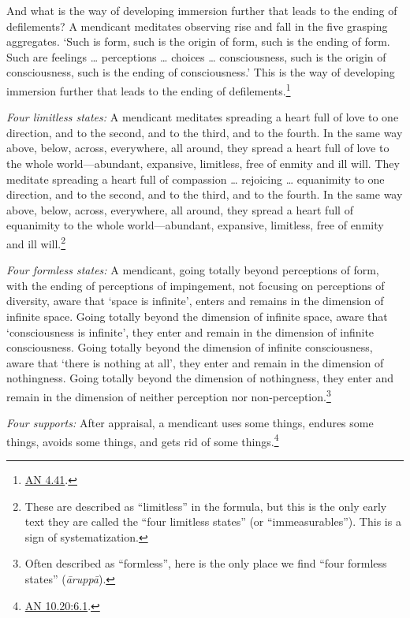 \documentclass[12pt,openany]{book}%
\begin{document}
And what is the way of developing immersion further that leads to the ending of defilements? A mendicant meditates observing rise and fall in the five grasping aggregates. ‘Such is form, such is the origin of form, such is the ending of form. Such are feelings … perceptions … choices … consciousness, such is the origin of consciousness, such is the ending of consciousness.’ This is the way of developing immersion further that leads to the ending of defilements.\footnote{\href{https://suttacentral.net/an4.41/en/sujato}{AN 4.41}. } 

\emph{Four limitless states:} A mendicant meditates spreading a heart full of love to one direction, and to the second, and to the third, and to the fourth. In the same way above, below, across, everywhere, all around, they spread a heart full of love to the whole world—abundant, expansive, limitless, free of enmity and ill will. They meditate spreading a heart full of compassion … rejoicing … equanimity to one direction, and to the second, and to the third, and to the fourth. In the same way above, below, across, everywhere, all around, they spread a heart full of equanimity to the whole world—abundant, expansive, limitless, free of enmity and ill will.\footnote{These are described as “limitless” in the formula, but this is the only early text they are called the “four limitless states” (or “immeasurables”). This is a sign of systematization. } 

\emph{Four formless states:} A mendicant, going totally beyond perceptions of form, with the ending of perceptions of impingement, not focusing on perceptions of diversity, aware that ‘space is infinite’, enters and remains in the dimension of infinite space. Going totally beyond the dimension of infinite space, aware that ‘consciousness is infinite’, they enter and remain in the dimension of infinite consciousness. Going totally beyond the dimension of infinite consciousness, aware that ‘there is nothing at all’, they enter and remain in the dimension of nothingness. Going totally beyond the dimension of nothingness, they enter and remain in the dimension of neither perception nor non-perception.\footnote{Often described as “formless”, here is the only place we find “four formless states” (\textit{\textsanskrit{āruppā}}). } 

\emph{Four supports:} After appraisal, a mendicant uses some things, endures some things, avoids some things, and gets rid of some things.\footnote{\href{https://suttacentral.net/an10.20/en/sujato\#6.1}{AN 10.20:6.1}. } 
\end{document}

